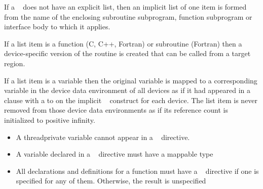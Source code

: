 \fortranspecificstart
If a ~ does not have an explicit list, then an implicit list of one item is 
formed from the name of the enclosing subroutine subprogram, function subprogram or 
interface body to which it applies.
\fortranspecificend

If a list item is a function (C, C++, Fortran) or subroutine (Fortran) then a 
device-specific version of the routine is created that can be called from a target region.

If a list item is a variable then the original variable is mapped to a corresponding variable in the device data environment of all devices as if it had appeared in a  clause with a  to on the implicit ~ construct for each device. The list item is never removed from those device data environments as if its reference count is initialized to positive infinity.

\restrictions
\begin{itemize}
\item A threadprivate variable cannot appear in a ~ directive.

\item A variable declared in a ~ directive must have a mappable type

\ccppspecificstart
\item All declarations and definitions for a function must have a ~
directive if one is specified for any of them. Otherwise, the result is unspecified
\end{itemize}
\ccppspecificend

